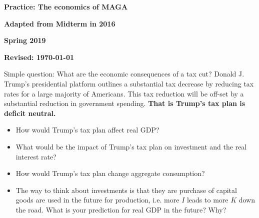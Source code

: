 \documentclass[12pt,pdftex,twoside,letterpaper]{exam}
\begin{document}
\centerline{\Large\bf Practice: The economics of MAGA }
\vspace{3mm}
\centerline{\Large\bf Adapted from Midterm in 2016}
\vspace{1mm}
\centerline{\large\bf Spring 2019}
\vspace{3mm}
\centerline{\bf Revised:  \today}
\bigskip

Simple question: What are the economic consequences of a tax cut?  Donald J. Trump's presidential platform outlines a substantial tax decrease by reducing tax rates for a large majority of Americans. This tax reduction will be off-set by a substantial reduction in government spending. \textbf{That is Trump's tax plan is deficit neutral.}

\begin{itemize}
\item How would Trump's tax plan affect real GDP?

\item What would be the impact of Trump's tax plan on investment and the real interest rate?

\item How would Trump's tax plan change aggregate consumption?

\item The way to think about investments is that they are purchase of capital goods are used in the future for production, i.e. more $I$ leads to more $K$ down the road. What is your prediction for real GDP in the future? Why?

\end{itemize}
\end{document}
